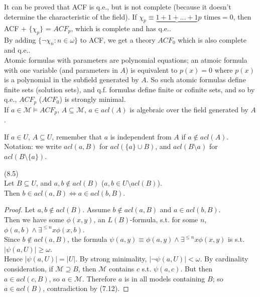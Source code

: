 \documentclass[a4paper]{article}
\begin{document}
\begin{eg}
    It can be proved that ACF is q.e., but is not complete (because it doesn't determine the characteristic of the field). If $\chi_p \equiv \underbrace{1+1+...+1}{p \text{ times}} = 0$, then ACF + $\{\chi_p\}$ = $ACF_p$, which is complete and has q.e..\\
    By adding $\{\neg \chi_n: n \in \omega\}$ to ACF, we get a theory $ACF_0$ which is also complete and q.e..\\
    Atomic formulas with parameters are polynomial equations; an atmoic formula with one variable (and parameters in $A$) is equivalent to $p(x) = 0$ where $p(x)$ is a polynomial in the subfield generated by $A$. So such atomic formulas define finite sets (solution sets), and q.f. formulas define finite or cofinite sets, and so by q.e., $ACF_p$ ($ACF_0$) is strongly minimal.\\
    If $a \in \mathcal{M} \vDash ACF_p$, $A \subseteq \mathcal{M}$, $a \in acl(A)$ is algebraic over the field generated by $A$.
\end{eg}

If $a \in U$, $A \subseteq U$, remember that $a$ is independent from $A$ if $a \not\in acl(A)$.\\
Notation: we write $acl(a,B)$ for $acl(\{a\} \cup B)$, and $acl(B \setminus a)$ for $acl(B \setminus \{a\})$.

\begin{thm} (8.5)\\
    Let $B \subseteq U$, and $a,b \not\in acl(B)$ ($a,b \in U \setminus acl(B)$).\\
    Then $b \in acl(a,B) \iff a \in acl(b,B)$.
    \begin{proof}
        Let $a,b \not\in acl(B)$. Assume $b \not\in acl(a,B)$ and $a \in acl(b,B)$.\\
        Then we have some $\phi(x,y)$, an $L(B)$-formula, s.t. for some $n$, $\phi(a,b) \wedge \exists^{\leq n} x \phi(x,b)$.\\
        Since $b \not\in acl(a,B)$, the formula $\psi(a,y) \equiv \phi(a,y) \wedge \exists^{\leq n} x \phi(x,y)$ is s.t. $|\psi(a,U)| \geq \omega$.\\
        Hence $|\psi(a,U)| = |U|$. By strong minimality, $|\neg \psi(a,U)| < \omega$. By cardinality consideration, if $\mathcal{M} \supseteq B$, then $\mathcal{M}$ contains $c$ s.t. $\psi(a,c)$. But then $a \in acl(c,B)$, so $a \in \mathcal{M}$. Therefore $a$ is in all models containing $B$; so $a \in acl(B)$, contradiction by (7.12).
    \end{proof}
\end{thm}
\end{document}
